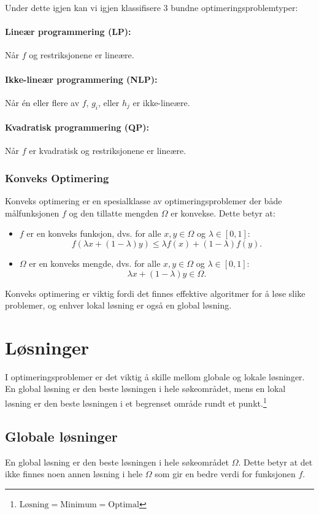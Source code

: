 Under dette igjen kan vi igjen klassifisere 3 bundne optimeringsproblemtyper:
\paragraph{Lineær programmering (LP):} Når \(f\) og restriksjonene er lineære.
\paragraph{Ikke-lineær programmering (NLP):} Når én eller flere av \(f\), \(g_i\), eller \(h_j\) er ikke-lineære.
\paragraph{Kvadratisk programmering (QP):} Når \(f\) er kvadratisk og restriksjonene er lineære.

\subsubsection{Konveks Optimering}
Konveks optimering er en spesialklasse av optimeringsproblemer der både målfunksjonen \(f\) og den tillatte mengden \(\Omega\) er konvekse. Dette betyr at:

\begin{itemize}
	\item \(f\) er en konveks funksjon, dvs. for alle \(x, y \in \Omega\) og \(\lambda \in [0, 1]\):
	      \[
		      f(\lambda x + (1-\lambda)y) \leq \lambda f(x) + (1-\lambda)f(y).
	      \]
	\item \(\Omega\) er en konveks mengde, dvs. for alle \(x, y \in \Omega\) og \(\lambda \in [0, 1]\):
	      \[
		      \lambda x + (1-\lambda)y \in \Omega.
	      \]
\end{itemize}

Konveks optimering er viktig fordi det finnes effektive algoritmer for å løse slike problemer, og enhver lokal løsning er også en global løsning.

\section{Løsninger}
\label{sec:solutions}
I optimeringsproblemer er det viktig å skille mellom globale og lokale løsninger. En global løsning er den beste løsningen i hele søkeområdet, mens en lokal løsning er den beste løsningen i et begrenset område rundt et punkt.\footnote{\(\text{Løsning} = \text{Minimum} = \text{Optimal}\)}

\subsection{Globale løsninger}
En global løsning er den beste løsningen i hele søkeområdet \(\Omega\). Dette betyr at det ikke finnes noen annen løsning i hele \(\Omega\) som gir en bedre verdi for funksjonen \(f\).

